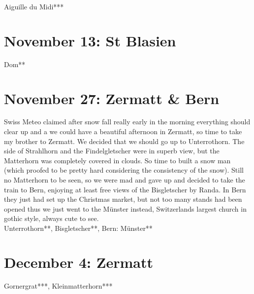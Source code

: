 Aiguille du Midi***

\section{November 13: St Blasien}
\label{2010StBlasien}

Dom**

\section{November 27: Zermatt \& Bern}
\label{2010ZermattBern}

Swiss Meteo claimed after snow fall really early in the morning everything should clear up and a we could have a beautiful afternoon in Zermatt, so time to take my brother to Zermatt. We decided that we should go up to Unterrothorn. The side of Strahlhorn and the Findelgletscher were in superb view, but the Matterhorn was completely covered in clouds. So time to built a snow man (which proofed to be pretty hard considering the consistency of the snow). Still no Matterhorn to be seen, so we were mad and gave up and decided to take the train to Bern, enjoying at least free views of the Bisgletscher by Randa. In Bern they just had set up the Christmas market, but not too many stands had been opened thus we just went to the M\"unster instead, Switzerlands largest church in gothic style, always cute to see.\\

Unterrothorn**, Bisgletscher**, Bern: M\"unster**

\section{December 4: Zermatt}
\label{2010ZermattII}

Gornergrat***, Kleinmatterhorn***